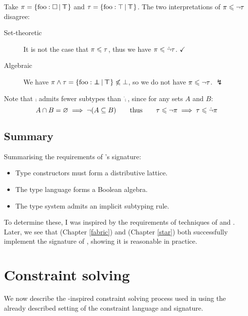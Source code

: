 \begin{example}
    Take $\pi = \flext{\mathrm{foo}: \flabsent }{\flftop}$ and $\tau = \flext{\mathrm{foo}: \top}{\flftop}$. The two interpretations of $\pi \leqslant \lnot \tau$ disagree: \begin{description}
        \item[Set-theoretic] It is not the case that $\pi \leqslant \tau$, thus we have $\pi \leqslant \dot {\lnot} \tau$. $\checkmark$
        \item[Algebraic] We have $\pi \meet \tau = \flext{\mathrm{foo} : \flfbot }{\flftop} \not\sub \bot$, so we do not have $\pi \leqslant \lnot \tau$. $\lightning$
    \end{description}
    Note that $\comp$ admits fewer subtypes than $\dot \comp$, since for any sets $A$ and $B$: 
    $$A \cap B = \varnothing \implies \lnot(A \subseteq B) \qquad\text{thus}\qquad \tau \leqslant \lnot \pi \implies \tau \leqslant \dot{\lnot} \pi $$ 
\end{example}

\subsection{Summary} Summarising the requirements of \inference{}'s signature: \begin{itemize}
    \item Type constructors must form a distributive lattice.
    \item The type language forms a Boolean algebra.
    \item The type system admits an implicit subtyping rule.
\end{itemize} 
To determine these, I was inspired by the requirements of techniques of \textcite{mlsub} and \textcite{mlstruct}.
Later, we see that \fabric{} (Chapter \ref{fabric}) and \starr{} (Chapter \ref{star}) both successfully implement the signature of \inference{}, showing it is reasonable in practice.

\section{Constraint solving}
\label{sec:constraints}

We now describe the \mlstruct{}-inspired constraint solving process used in \inference{} using the already described setting of the constraint language and signature. 

